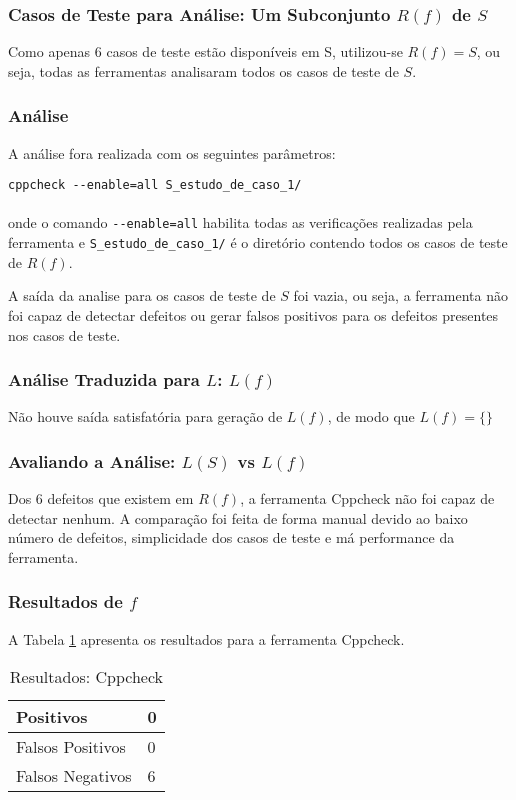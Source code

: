 \subsubsection{Casos de Teste para Análise: Um Subconjunto $R(f)$ de $S$}

Como apenas 6 casos de teste estão disponíveis em S, utilizou-se $R(f) = S$, ou seja, todas as ferramentas analisaram todos os casos de teste de $S$.

\subsubsection{Análise}

A análise fora realizada com os seguintes parâmetros:

\lstinline{cppcheck --enable=all S_estudo_de_caso_1/}\\\\
onde o comando \lstinline{--enable=all} habilita todas as verificações realizadas pela ferramenta e \lstinline{S_estudo_de_caso_1/} é o diretório contendo todos os casos de teste de $R(f)$.

A saída da analise para os casos de teste de $S$ foi vazia, ou seja, a ferramenta não foi capaz de detectar defeitos ou gerar falsos positivos para os defeitos presentes nos casos de teste.

\subsubsection{Análise Traduzida para $L$: $L(f)$}

Não houve saída satisfatória para geração de $L(f)$, de modo que 
$L(f) = \lbrace\rbrace$
\subsubsection{Avaliando a Análise: $L(S)$ vs $L(f)$}

Dos 6 defeitos que existem em $R(f)$, a ferramenta Cppcheck não foi capaz de detectar nenhum. A comparação foi feita de forma manual devido ao baixo número de defeitos, simplicidade dos casos de teste e má performance da ferramenta.

\subsubsection{Resultados de $f$}

A Tabela \ref{tabela_cppcheck} apresenta os resultados para a ferramenta Cppcheck.
\begin{table}[h]
\caption{Resultados: Cppcheck}
  \centering
\begin{tabular}{l | l}
  \hline
  Positivos\index{positivo} & 0 \\ \hline
  Falsos Positivos\index{falso positivo} & 0 \\ \hline
  Falsos Negativos\index{falso negativo} & 6 \\
  \hline
\end{tabular}
\label{tabela_cppcheck}
\end{table}
